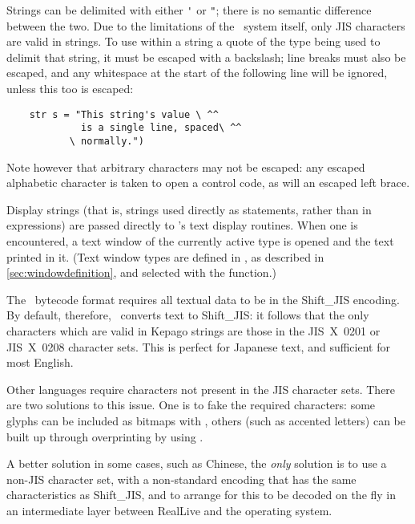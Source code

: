 \label{sec:strings}

  Strings can be delimited with either \lstinline|'| or \lstinline|"|; there is
  no semantic difference between the two.  Due to the limitations of the
  \reallive\ system itself, only JIS characters are valid in strings. To use
  within a string a quote of the type being used to delimit that string, it must
  be escaped with a backslash; line breaks must also be escaped, and any
  whitespace at the start of the following line will be ignored, unless this too
  is escaped:
  \begin{lstlisting}
    str s = "This string's value \ ^^
             is a single line, spaced\ ^^
           \ normally.")
  \end{lstlisting}

  Note however that arbitrary characters may not be escaped: any escaped
  alphabetic character is taken to open a control code, as will an escaped left
  brace.


    Display strings (that is, strings used directly as statements, rather than
    in expressions) are passed directly to \reallive's text display routines.
    When one is encountered, a text window of the currently active type is
    opened and the text printed in it.  (Text window types are defined in
    \gameexe, as described in \ref{sec:windowdefinition}, and selected with the
    \fnref{TextWindow} function.)

  \label{sec:encodings}

    The \reallive\ bytecode format requires all textual data to be in the 
    Shift\_JIS encoding.  By default, therefore, \package\ converts text to 
    Shift\_JIS: it follows that the only characters which are valid in Kepago 
    strings are those in the JIS~X~0201 or JIS~X~0208 character sets. This is 
    perfect for Japanese text, and sufficient for most English.
    
    Other languages require characters not present in the JIS character sets. 
    There are two solutions to this issue.  One is to fake the required 
    characters: some glyphs can be included as bitmaps with \ccref{em}, others 
    (such as accented letters) can be built up through overprinting by using 
    \ccref{mv}.
    
    A better solution\,\textemdash\,in some cases, such as Chinese, the 
    \emph{only} solution\,\textemdash\,is to use a non-JIS character set, with a 
    non-standard encoding that has the same characteristics as Shift\_JIS, and to 
    arrange for this to be decoded on the fly in an intermediate layer between 
    RealLive and the operating system.
    
